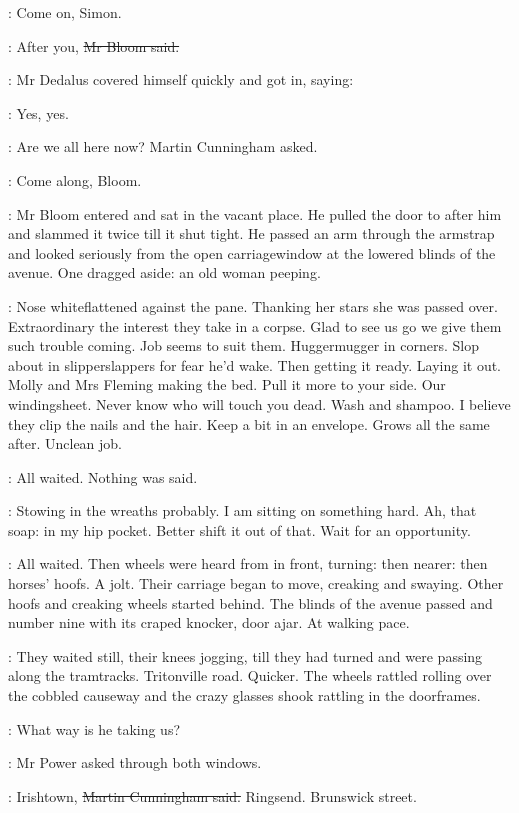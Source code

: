 \power:
Come on, Simon.

\Bloom:
After you,
\sout{Mr Bloom said.}

:
Mr Dedalus covered himself quickly and got in, saying:

\simon:
Yes, yes.

\cunningham:
Are we all here now?
Martin Cunningham asked.

\cunningham:
Come along, Bloom.

:
Mr Bloom entered and sat in the vacant place.
He pulled the door to after him
and slammed it twice till it shut tight.
He passed an arm through the armstrap
and looked seriously from the open carriagewindow
at the lowered blinds of the avenue.
One dragged aside:
an old woman peeping.

\BloomInt:
Nose whiteflattened against the pane.
Thanking her stars she was passed over.
Extraordinary the interest they take in a corpse.
Glad to see us go
we give them such trouble coming.
Job seems to suit them.
Huggermugger in corners.
Slop about in slipperslappers for fear he'd wake.
Then getting it ready.
Laying it out.
Molly and Mrs Fleming making the bed.
Pull it more to your side.
Our windingsheet.
Never know who will touch you dead.
Wash and shampoo.
I believe they clip the nails and the hair.
Keep a bit in an envelope.
Grows all the same after.
Unclean job.

:
All waited.
Nothing was said.

\BloomInt:
Stowing in the wreaths probably.
I am sitting on something hard.
Ah, that soap:
in my hip pocket.
Better shift it out of that.
Wait for an opportunity.

:
All waited.
Then wheels were heard from in front, turning:
then nearer:
then horses' hoofs.
A jolt.
Their carriage began to move, creaking and swaying.
Other hoofs and creaking wheels started behind.
The blinds of the avenue passed
and number nine with its craped knocker, door ajar.
At walking pace.

:
They waited still, their knees jogging, till they had turned
and were passing along the tramtracks.
Tritonville road.
Quicker.
The wheels
rattled rolling over the cobbled causeway
and the crazy glasses shook rattling in the doorframes.

\power:
What way is he taking us?

:
Mr Power asked through both windows.

\cunningham:
Irishtown,
\sout{Martin Cunningham said.}
Ringsend.
Brunswick street.

